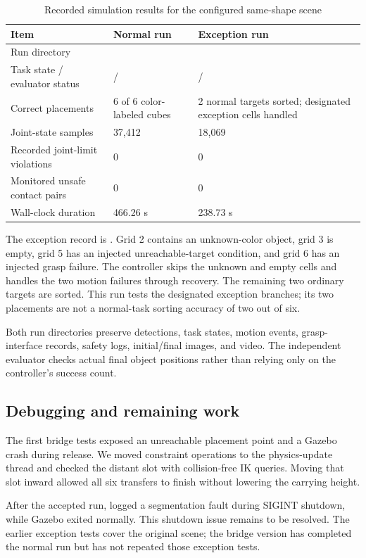 \begin{table}[H]\tabstart
\caption{Recorded simulation results for the configured same-shape scene}
\begin{tabularx}{\textwidth}{@{}L{4.2cm}Y Y@{}}
\toprule Item & Normal run & Exception run\\\midrule
Run directory &  & \\
Task state / evaluator status &  /  &  / \\
Correct placements & 6 of 6 color-labeled cubes & 2 normal targets sorted; designated exception cells handled\\
Joint-state samples & 37,412 & 18,069\\
Recorded joint-limit violations & 0 & 0\\
Monitored unsafe contact pairs & 0 & 0\\
Wall-clock duration & 466.26 s & 238.73 s\\
\bottomrule
\end{tabularx}
\end{table}

The exception record is . Grid 2 contains an unknown-color object, grid 3 is empty, grid 5 has an injected unreachable-target condition, and grid 6 has an injected grasp failure. The controller skips the unknown and empty cells and handles the two motion failures through recovery. The remaining two ordinary targets are sorted. This run tests the designated exception branches; its two placements are not a normal-task sorting accuracy of two out of six.

Both run directories preserve detections, task states, motion events, grasp-interface records, safety logs, initial/final images, and video. The independent evaluator checks actual final object positions rather than relying only on the controller's success count. 

\subsection{Debugging and remaining work}
The first bridge tests exposed an unreachable placement point and a Gazebo crash during release. We moved constraint operations to the physics-update thread and checked the distant slot with collision-free IK queries. Moving that slot inward allowed all six transfers to finish without lowering the carrying height.

After the accepted run,  logged a segmentation fault during SIGINT shutdown, while Gazebo exited normally. This shutdown issue remains to be resolved. The earlier exception tests cover the original scene; the bridge version has completed the normal run but has not repeated those exception tests.

